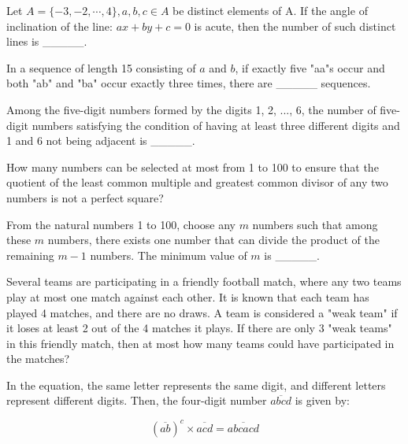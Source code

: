 \begin{problem}\label{Combinary-31}
Let $A=\{-3,-2, \cdots, 4\}, a, b, c \in A$ be distinct elements of A. If the angle of inclination of the line: $a x+b y+c=0$ is acute, then the number of such distinct lines is \_\_\_\_\_.
\end{problem}


\begin{problem}\label{Combinary-32}
 In a sequence of length 15 consisting of $a$ and $b$, if exactly five "aa"s occur and both "ab" and "ba" occur exactly three times, there are \_\_\_\_\_ sequences.
\end{problem}


\begin{problem}\label{Combinary-33}
 Among the five-digit numbers formed by the digits 1, 2, ..., 6, the number of five-digit numbers satisfying the condition of having at least three different digits and 1 and 6 not being adjacent is \_\_\_\_\_.
\end{problem}


\begin{problem}\label{Combinary-34}
How many numbers can be selected at most from 1 to 100 to ensure that the quotient of the least common multiple and greatest common divisor of any two numbers is not a perfect square? 
\end{problem}


\begin{problem}\label{Combinary-35}
 From the natural numbers 1 to 100, choose any \( m \) numbers such that among these \( m \) numbers, there exists one number that can divide the product of the remaining \( m-1 \) numbers. The minimum value of \( m \) is \_\_\_\_\_.
\end{problem}


\begin{problem}\label{Combinary-36}
Several teams are participating in a friendly football match, where any two teams play at most one match against each other. It is known that each team has played 4 matches, and there are no draws. A team is considered a "weak team" if it loses at least 2 out of the 4 matches it plays. If there are only 3 "weak teams" in this friendly match, then at most how many teams could have participated in the matches?
\end{problem}




\begin{problem}\label{Combinary-37}
In the equation, the same letter represents the same digit, and different letters represent different digits. Then, the four-digit number \(\overline{a b c d}\) is given by:

$$
(\overline{a b})^{c} \times \overline{a c d}=\overline{a b c a c d}
$$ 
\end{problem}



